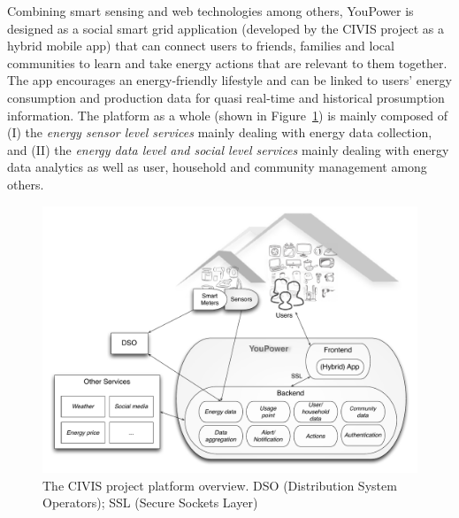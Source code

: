
Combining smart sensing and web technologies among others,
YouPower is designed as a social smart grid application (developed by the CIVIS project as a hybrid mobile app) that can connect users to friends, families and local communities to learn and take energy actions that are relevant to them together. The app encourages an energy-friendly lifestyle and can be linked to users' energy consumption and production data for quasi real-time and historical prosumption information. 
% 
%
The platform as a whole (shown in Figure~\ref{fig:platform}) is mainly composed of (I) the \textit{energy sensor level services} mainly
dealing with energy data collection, and (II) the \textit{energy data level and social
level services} mainly dealing with energy data analytics as well as user, household and community management
among others. 

\begin{figure}[h!]
\sidecaption[t]
	\includegraphics[width=.64\linewidth]{img/civis_platform_overview.pdf} %
	\caption{The CIVIS project platform overview. DSO (Distribution System Operators); SSL (Secure Sockets Layer)}\label{fig:platform}
\end{figure}


